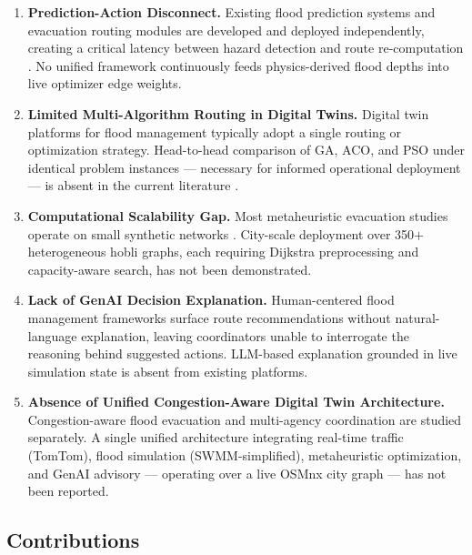 \documentclass[journal]{IEEEtran}
\begin{document}
\begin{enumerate}
  \item \textbf{Prediction-Action Disconnect.} Existing flood prediction systems and
  evacuation routing modules are developed and deployed independently, creating a critical
  latency between hazard detection and route re-computation \cite{gupta2025ai,
  anik2025evolution}. No unified framework continuously feeds physics-derived flood depths
  into live optimizer edge weights.

  \item \textbf{Limited Multi-Algorithm Routing in Digital Twins.} Digital twin platforms for
  flood management \cite{zhou2025rainfall, mandal2025cityscale, prihatmanto2025digitaltwin}
  typically adopt a single routing or optimization strategy. Head-to-head comparison of GA,
  ACO, and PSO under identical problem instances — necessary for informed operational
  deployment — is absent in the current literature \cite{yin2025overview, li2025metaheuristic}.

  \item \textbf{Computational Scalability Gap.} Most metaheuristic evacuation studies operate
  on small synthetic networks \cite{nirwana2024intelligent, li2024evacuation}. City-scale
  deployment over 350$+$ heterogeneous hobli graphs, each requiring Dijkstra preprocessing
  and capacity-aware search, has not been demonstrated.

  \item \textbf{Lack of GenAI Decision Explanation.} Human-centered flood management
  frameworks \cite{alizadeh2023humancentered, behrooz2024adaptive} surface route
  recommendations without natural-language explanation, leaving coordinators unable to
  interrogate the reasoning behind suggested actions. LLM-based explanation grounded in live
  simulation state is absent from existing platforms.

  \item \textbf{Absence of Unified Congestion-Aware Digital Twin Architecture.}
  Congestion-aware flood evacuation \cite{wang2024congestion} and multi-agency coordination
  \cite{chen2025evacuation} are studied separately. A single unified architecture integrating
  real-time traffic (TomTom), flood simulation (SWMM-simplified), metaheuristic optimization,
  and GenAI advisory — operating over a live OSMnx city graph — has not been reported.
\end{enumerate}

\subsection{Contributions}
\end{document}
